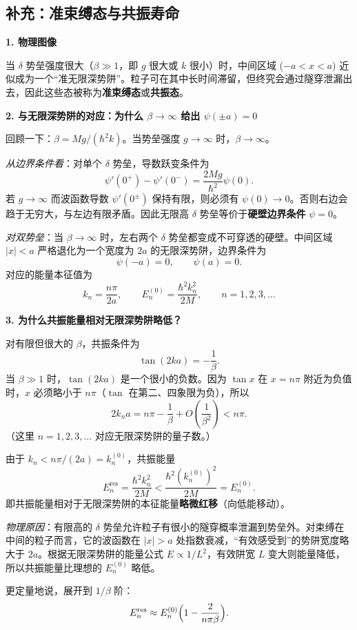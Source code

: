 \subsection{补充：准束缚态与共振寿命}

\textbf{1. 物理图像}

当 $\delta$ 势垒强度很大（$\beta \gg 1$，即 $g$ 很大或 $k$ 很小）时，中间区域 ($-a<x<a$) 近似成为一个``准无限深势阱''。粒子可在其中长时间滞留，但终究会通过隧穿泄漏出去，因此这些态被称为\textbf{准束缚态}或\textbf{共振态}。

\textbf{2. 与无限深势阱的对应：为什么 $\beta\to\infty$ 给出 $\psi(\pm a)=0$}

回顾一下：$\beta = Mg/(\hbar^2 k)$。当势垒强度 $g\to\infty$ 时，$\beta\to\infty$。

\textit{从边界条件看}：对单个 $\delta$ 势垒，导数跃变条件为
\[
\psi'(0^+) - \psi'(0^-) = \frac{2Mg}{\hbar^2}\psi(0).
\]
若 $g\to\infty$ 而波函数导数 $\psi'(0^\pm)$ 保持有限，则必须有 $\psi(0)\to 0$。否则右边会趋于无穷大，与左边有限矛盾。因此无限高 $\delta$ 势垒等价于\textbf{硬壁边界条件} $\psi=0$。

\textit{对双势垒}：当 $\beta\to\infty$ 时，左右两个 $\delta$ 势垒都变成不可穿透的硬壁。中间区域 $|x|<a$ 严格退化为一个宽度为 $2a$ 的无限深势阱，边界条件为
\[
\psi(-a)=0, \qquad \psi(a)=0.
\]
对应的能量本征值为
\[
k_n = \frac{n\pi}{2a}, \qquad E_n^{(0)} = \frac{\hbar^2 k_n^2}{2M}, \qquad n=1,2,3,\dots
\]

\textbf{3. 为什么共振能量相对无限深势阱略低？}

对有限但很大的 $\beta$，共振条件为
\[
\tan(2ka) = -\frac{1}{\beta}.
\]
当 $\beta\gg 1$ 时，$\tan(2ka)$ 是一个很小的负数。因为 $\tan x$ 在 $x=n\pi$ 附近为负值时，$x$ 必须略小于 $n\pi$（$\tan$ 在第二、四象限为负），所以
\[
2k_n a = n\pi - \frac{1}{\beta} + O\left(\frac{1}{\beta^2}\right) < n\pi.
\]
（这里 $n=1,2,3,\dots$ 对应无限深势阱的量子数。）

由于 $k_n < n\pi/(2a) = k_n^{(0)}$，共振能量
\[
E_n^{\text{res}} = \frac{\hbar^2 k_n^2}{2M} < \frac{\hbar^2 (k_n^{(0)})^2}{2M} = E_n^{(0)}.
\]
即共振能量相对于无限深势阱的本征能量\textbf{略微红移}（向低能移动）。

\textit{物理原因}：有限高的 $\delta$ 势垒允许粒子有很小的隧穿概率泄漏到势垒外。对束缚在中间的粒子而言，它的波函数在 $|x|>a$ 处指数衰减，``有效感受到''的势阱宽度略大于 $2a$。根据无限深势阱的能量公式 $E\propto 1/L^2$，有效阱宽 $L$ 变大则能量降低，所以共振能量比理想的 $E_n^{(0)}$ 略低。

更定量地说，展开到 $1/\beta$ 阶：
\[
E_n^{\text{res}} \approx E_n^{(0)} \Bigl(1 - \frac{2}{n\pi\beta}\Bigr).
\]

